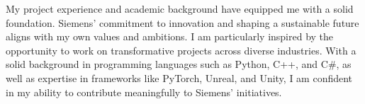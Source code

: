 My project experience and academic background have equipped me with a solid foundation. 
Siemens' commitment to innovation and shaping a sustainable future aligns with my own values 
and ambitions. I am particularly inspired by the opportunity to work on transformative projects
 across diverse industries. 
 With a solid background in programming languages such as Python, C++, and C\#, 
 as well as expertise in frameworks like PyTorch, Unreal, and Unity, 
 I am confident in my ability to contribute meaningfully to Siemens' initiatives.